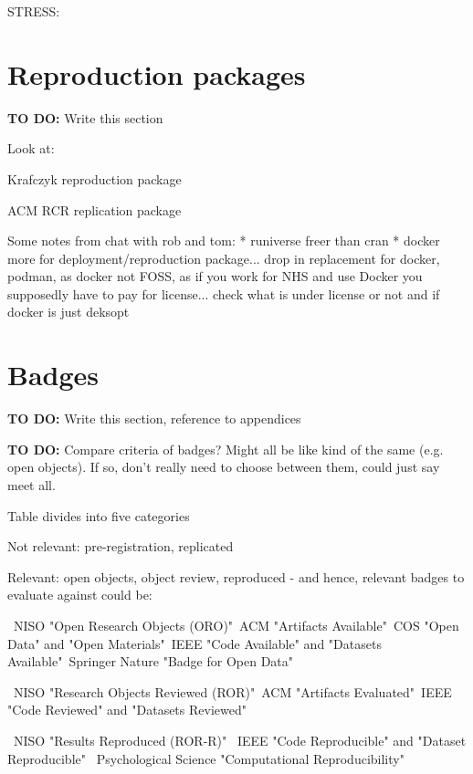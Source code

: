 STRESS:

\section{Reproduction packages}

\textbf{TO DO:} Write this section

Look at:

Krafczyk reproduction package

ACM RCR replication package

Some notes from chat with rob and tom:
* runiverse freer than cran
* docker more for deployment/reproduction package... drop in replacement for docker, podman, as docker not FOSS, as if you work for NHS and use Docker you supposedly have to pay for license... check what is under license or not and if docker is just deksopt

\section{Badges}

\textbf{TO DO:} Write this section, reference to appendices

\textbf{TO DO:} Compare criteria of badges? Might all be like kind of the same (e.g. open objects). If so, don't really need to choose between them, could just say meet all.

Table divides into five categories

Not relevant: pre-registration, replicated

Relevant: open objects, object review, reproduced - and hence, relevant badges to evaluate against could be:

\textbullet\ NISO "Open Research Objects (ORO)"\newline \textbullet\ ACM "Artifacts Available"\newline \textbullet\ COS "Open Data" and "Open Materials"\newline \textbullet\ IEEE "Code Available" and "Datasets Available"\newline \textbullet\ Springer Nature "Badge for Open Data"

\textbullet\ NISO "Research Objects Reviewed (ROR)"\newline \textbullet\ ACM "Artifacts Evaluated"\newline \textbullet\ IEEE "Code Reviewed" and "Datasets Reviewed"

\textbullet\ NISO "Results Reproduced (ROR-R)" \newline \textbullet\ IEEE "Code Reproducible" and "Dataset Reproducible" \newline \textbullet\ Psychological Science "Computational Reproducibility"
            
